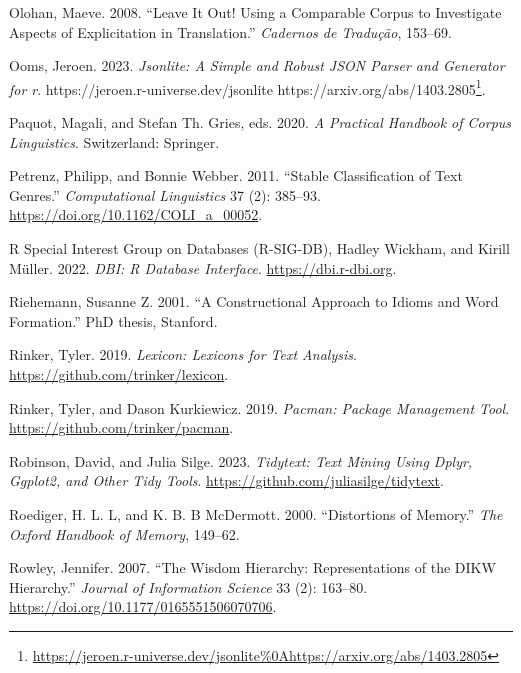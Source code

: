 \documentclass[
  letterpaper,
  DIV=11,
  numbers=noendperiod]{scrreport}
\newlength{\cslhangindent}
\newlength{\cslentryspacingunit} %
\newenvironment{CSLReferences}[2] %
 {%
  \setlength{\parindent}{0pt}
  \ifodd #1
  \let\oldpar\par
  \def\par{\hangindent=\cslhangindent\oldpar}
  \fi
  \setlength{\parskip}{#2\cslentryspacingunit}
 }%
 {}
\theoremstyle{definition}
\theoremstyle{remark}
\DeclareRobustCommand{\href}[2]{#2\footnote{\url{#1}}}
\begin{document}
\begin{CSLReferences}{1}{0}
\leavevmode{}%
Olohan, Maeve. 2008. {``Leave It Out! Using a Comparable Corpus to
Investigate Aspects of Explicitation in Translation.''} \emph{Cadernos
de Tradução}, 153--69.

\leavevmode{}%
Ooms, Jeroen. 2023. \emph{Jsonlite: A Simple and Robust JSON Parser and
Generator for r}.
\href{https://jeroen.r-universe.dev/jsonlite\%0Ahttps://arxiv.org/abs/1403.2805}{https://jeroen.r-universe.dev/jsonlite
https://arxiv.org/abs/1403.2805}.

\leavevmode{}%
Paquot, Magali, and Stefan Th. Gries, eds. 2020. \emph{A Practical
Handbook of Corpus Linguistics}. Switzerland: Springer.

\leavevmode{}%
Petrenz, Philipp, and Bonnie Webber. 2011. {``Stable Classification of
Text Genres.''} \emph{Computational Linguistics} 37 (2): 385--93.
\url{https://doi.org/10.1162/COLI_a_00052}.

\leavevmode{}%
R Special Interest Group on Databases (R-SIG-DB), Hadley Wickham, and
Kirill Müller. 2022. \emph{DBI: R Database Interface}.
\url{https://dbi.r-dbi.org}.

\leavevmode{}%
Riehemann, Susanne Z. 2001. {``A Constructional Approach to Idioms and
Word Formation.''} PhD thesis, Stanford.

\leavevmode{}%
Rinker, Tyler. 2019. \emph{Lexicon: Lexicons for Text Analysis}.
\url{https://github.com/trinker/lexicon}.

\leavevmode{}%
Rinker, Tyler, and Dason Kurkiewicz. 2019. \emph{Pacman: Package
Management Tool}. \url{https://github.com/trinker/pacman}.

\leavevmode{}%
Robinson, David, and Julia Silge. 2023. \emph{Tidytext: Text Mining
Using Dplyr, Ggplot2, and Other Tidy Tools}.
\url{https://github.com/juliasilge/tidytext}.

\leavevmode{}%
Roediger, H. L. L, and K. B. B McDermott. 2000. {``Distortions of
Memory.''} \emph{The Oxford Handbook of Memory}, 149--62.

\leavevmode{}%
Rowley, Jennifer. 2007. {``The Wisdom Hierarchy: Representations of the
DIKW Hierarchy.''} \emph{Journal of Information Science} 33 (2):
163--80. \url{https://doi.org/10.1177/0165551506070706}.


\end{CSLReferences}
\end{document}
